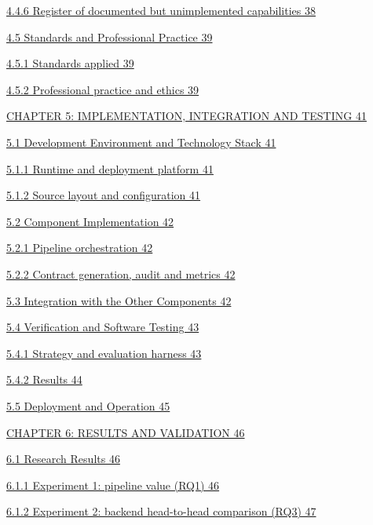 \documentclass[
]{article}
\begin{document}
\protect\hyperlink{register-of-documented-but-unimplemented-capabilities}{4.4.6
Register of documented but unimplemented capabilities 38}

\protect\hyperlink{standards-and-professional-practice}{4.5 Standards
and Professional Practice 39}

\protect\hyperlink{standards-applied}{4.5.1 Standards applied 39}

\protect\hyperlink{professional-practice-and-ethics}{4.5.2 Professional
practice and ethics 39}

\protect\hyperlink{chapter-5-implementation-integration-and-testing}{CHAPTER
5: IMPLEMENTATION, INTEGRATION AND TESTING 41}

\protect\hyperlink{development-environment-and-technology-stack}{5.1
Development Environment and Technology Stack 41}

\protect\hyperlink{runtime-and-deployment-platform}{5.1.1 Runtime and
deployment platform 41}

\protect\hyperlink{source-layout-and-configuration}{5.1.2 Source layout
and configuration 41}

\protect\hyperlink{component-implementation}{5.2 Component
Implementation 42}

\protect\hyperlink{pipeline-orchestration}{5.2.1 Pipeline orchestration
42}

\protect\hyperlink{contract-generation-audit-and-metrics}{5.2.2 Contract
generation, audit and metrics 42}

\protect\hyperlink{integration-with-the-other-components}{5.3
Integration with the Other Components 42}

\protect\hyperlink{verification-and-software-testing}{5.4 Verification
and Software Testing 43}

\protect\hyperlink{strategy-and-evaluation-harness}{5.4.1 Strategy and
evaluation harness 43}

\protect\hyperlink{results}{5.4.2 Results 44}

\protect\hyperlink{deployment-and-operation}{5.5 Deployment and
Operation 45}

\protect\hyperlink{chapter-6-results-and-validation}{CHAPTER 6: RESULTS
AND VALIDATION 46}

\protect\hyperlink{research-results}{6.1 Research Results 46}

\protect\hyperlink{experiment-1-pipeline-value-rq1}{6.1.1 Experiment 1:
pipeline value (RQ1) 46}

\protect\hyperlink{experiment-2-backend-head-to-head-comparison-rq3}{6.1.2
Experiment 2: backend head-to-head comparison (RQ3) 47}
\end{document}
